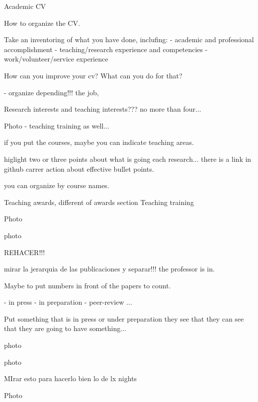 Academic CV

How to organize the CV.


Take an inventoring of what you have done, inclufing:
- academic and professional accomplishment
- teaching/research experience and competencies
- work/volunteer/service experience

How can you improve your cv? What can you do for that?


- organize depending!!! the job, 


Research interests and teaching interests??? no more than four...


Photo - teaching training as well...


if you put the courses, maybe you can indicate teaching areas.


higlight two or three points about what is going each research... there is a link in github carrer action about effective bullet points.


you can organize by course names.

Teaching awards, different of awards section
Teaching training


Photo 


photo


REHACER!!!

mirar la jerarquia de las publicaciones y separar!!! the professor is in.

Maybe to put numbers in front of the papers to count.

- in press
- in preparation
- peer-review
...

Put something that is in press or under preparation they see that they can see that they are going to have something...



photo


photo

MIrar esto para hacerlo bien lo de lx nights


Photo



